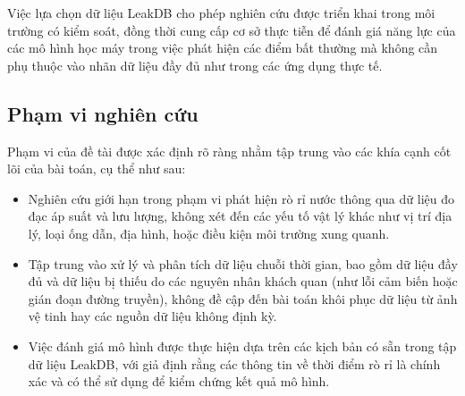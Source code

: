 Việc lựa chọn dữ liệu LeakDB cho phép nghiên cứu được triển khai trong môi trường có kiểm soát, đồng thời cung cấp cơ sở thực tiễn để đánh giá năng lực của các mô hình học máy trong việc phát hiện các điểm bất thường mà không cần phụ thuộc vào nhãn dữ liệu đầy đủ như trong các ứng dụng thực tế.

\subsection{Phạm vi nghiên cứu}
Phạm vi của đề tài được xác định rõ ràng nhằm tập trung vào các khía cạnh cốt lõi của bài toán, cụ thể như sau:
\begin{itemize}
    \item Nghiên cứu giới hạn trong phạm vi phát hiện rò rỉ nước thông qua dữ liệu đo đạc áp suất và lưu lượng, không xét đến các yếu tố vật lý khác như vị trí địa lý, loại ống dẫn, địa hình, hoặc điều kiện môi trường xung quanh.
    
    \item Tập trung vào xử lý và phân tích dữ liệu chuỗi thời gian, bao gồm dữ liệu đầy đủ và dữ liệu bị thiếu do các nguyên nhân khách quan (như lỗi cảm biến hoặc gián đoạn đường truyền), không đề cập đến bài toán khôi phục dữ liệu từ ảnh vệ tinh hay các nguồn dữ liệu không định kỳ.
    
    \item Việc đánh giá mô hình được thực hiện dựa trên các kịch bản có sẵn trong tập dữ liệu LeakDB, với giả định rằng các thông tin về thời điểm rò rỉ là chính xác và có thể sử dụng để kiểm chứng kết quả mô hình.
\end{itemize}

